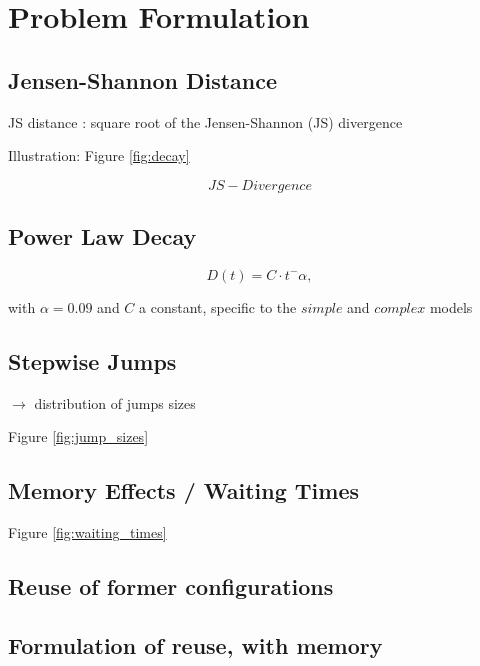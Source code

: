 \section{Problem Formulation}


\subsection{Jensen-Shannon Distance}

JS distance : square root of the Jensen-Shannon (JS) divergence

Illustration: Figure \ref{fig:decay}

\begin{equation}
\label{JS-divergence}
JS-Divergence
\end{equation}

\subsection{Power Law Decay}

\begin{equation}
\label{power_law_decay}
D(t) = C \cdot t^-\alpha,
\end{equation}

with $\alpha = 0.09$ and $C$ a constant, specific to the $simple$ and $complex$ models

 
\subsection{Stepwise Jumps}

$\rightarrow$ distribution of jumps sizes

Figure \ref{fig:jump_sizes}



\subsection{Memory Effects / Waiting Times}

Figure \ref{fig:waiting_times}


\subsection{Reuse of former configurations}



\subsection{Formulation of reuse, with memory}

